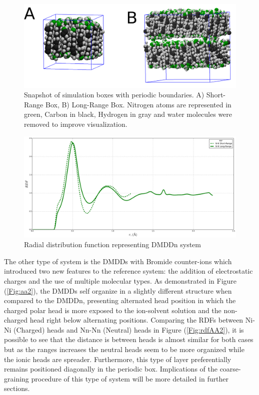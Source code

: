 \documentclass[10pt,a4paper,twoside]{article}
\begin{document}
\begin{figure}[H]
  \begin{center}
	\includegraphics[width=1 \textwidth]{./images/aa1}
	\caption{Snapshot of simulation boxes with periodic boundaries. A) Short-Range Box, B) Long-Range Box. Nitrogen atoms are represented in green, Carbon in black, Hydrogen in gray and water molecules were removed to improve visualization. }
	\label{Fig:aa1}
  \end{center}
\end{figure}

\begin{figure}[H]
  \begin{center}
	\includegraphics[width=1 \textwidth]{./graphs/rdfaa1}
	\caption{Radial distribution function representing DMDDn system}
	\label{Fig:rdfAA1}
  \end{center}
\end{figure}

The other type of system is the DMDDs with Bromide counter-ions which introduced two new features to the reference system: the addition of electrostatic charges and the use of multiple molecular types. As demonstrated in Figure (\ref{Fig:aa2}), the DMDDs self organize in a slightly different structure when compared to the DMDDn, presenting alternated head position in which the charged polar head is more exposed to the ion-solvent solution and the non-charged head right below alternating positions. Comparing the RDFs between Ni-Ni (Charged) heads and Nn-Nn (Neutral)  heads in Figure (\ref{Fig:rdfAA2}), it is possible to see that the distance is between heads is almost similar for both cases but as the ranges increases the neutral heads seem to be more organized while the ionic heads are spreader. Furthermore, this type of layer preferentially remains positioned diagonally in the periodic box. Implications of the coarse-graining procedure of this type of system will be more detailed in further sections.
\end{document}
